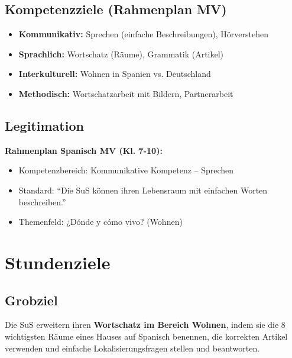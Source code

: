\documentclass[11pt,a4paper]{article}
\begin{document}
\subsection{Kompetenzziele (Rahmenplan MV)}
\begin{itemize}
    \item \textbf{Kommunikativ:} Sprechen (einfache Beschreibungen), Hörverstehen
    \item \textbf{Sprachlich:} Wortschatz (Räume), Grammatik (Artikel)
    \item \textbf{Interkulturell:} Wohnen in Spanien vs. Deutschland
    \item \textbf{Methodisch:} Wortschatzarbeit mit Bildern, Partnerarbeit
\end{itemize}

\subsection{Legitimation}
\textbf{Rahmenplan Spanisch MV (Kl. 7-10):}
\begin{itemize}
    \item Kompetenzbereich: Kommunikative Kompetenz -- Sprechen
    \item Standard: ``Die SuS können ihren Lebensraum mit einfachen Worten beschreiben.''
    \item Themenfeld: ¿Dónde y cómo vivo? (Wohnen)
\end{itemize}

\section{Stundenziele}

\subsection{Grobziel}
Die SuS erweitern ihren \textbf{Wortschatz im Bereich Wohnen}, indem sie die 8 wichtigsten Räume eines Hauses auf Spanisch benennen, die korrekten Artikel verwenden und einfache Lokalisierungsfragen stellen und beantworten.
\end{document}
